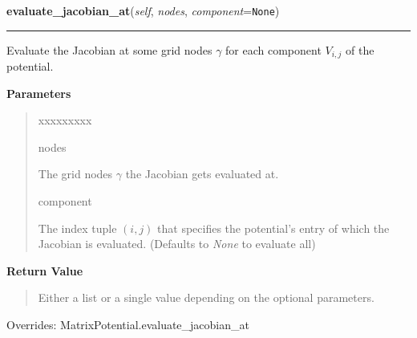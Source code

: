     \vspace{0.5ex}

\hspace{.8\funcindent}\begin{boxedminipage}{\funcwidth}

    \raggedright \textbf{evaluate\_jacobian\_at}(\textit{self}, \textit{nodes}, \textit{component}={\tt None})

    \vspace{-1.5ex}

    \rule{\textwidth}{0.5\fboxrule}
\setlength{\parskip}{2ex}
    Evaluate the Jacobian at some grid nodes $\gamma$ for
    each component $V_{i,j}$ of the potential.

\setlength{\parskip}{1ex}
      \textbf{Parameters}
      \vspace{-1ex}

      \begin{quote}
        \begin{Ventry}{xxxxxxxxx}

          \item[nodes]

          The grid nodes $\gamma$ the Jacobian gets
          evaluated at.

          \item[component]

          The index tuple $\left(i,j \right)$ that specifies
          the potential's entry of which the Jacobian is evaluated.
          (Defaults to \textit{None} to evaluate all)

        \end{Ventry}

      \end{quote}

      \textbf{Return Value}
    \vspace{-1ex}

      \begin{quote}
      Either a list or a single value depending on the optional parameters.

      \end{quote}



      Overrides: MatrixPotential.evaluate\_jacobian\_at

    \end{boxedminipage}

    \vspace{0.5ex}

